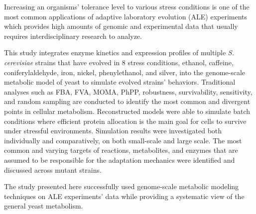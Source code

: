 Increasing an organisms’ tolerance level to various stress conditions is one of the most common applications of adaptive laboratory evolution (ALE) experiments which provides high amounts of genomic and experimental data that usually requires interdisciplinary research to analyze.

This study integrates enzyme kinetics and expression profiles of multiple \emph{S. cerevisiae} strains that have evolved in 8 stress conditions, ethanol, caffeine, coniferylaldehyde, iron, nickel, phenylethanol, and silver, into the genome-scale metabolic model of yeast to simulate evolved strains’ behaviors. Traditional analyses such as FBA, FVA, MOMA, PhPP, robustness, survivability, sensitivity, and random sampling are conducted to identify the most common and divergent points in cellular metabolism. Reconstructed models were able to simulate batch conditions where efficient protein allocation is the main goal for cells to survive under stressful environments. Simulation results were investigated both individually and comparatively, on both small-scale and large scale. The most common and varying targets of reactions, metabolites, and enzymes that are assumed to be responsible for the adaptation mechanics were identified and discussed across mutant strains.

The study presented here successfully used genome-scale metabolic modeling techniques on ALE experiments’ data while providing a systematic view of the general yeast metabolism.
